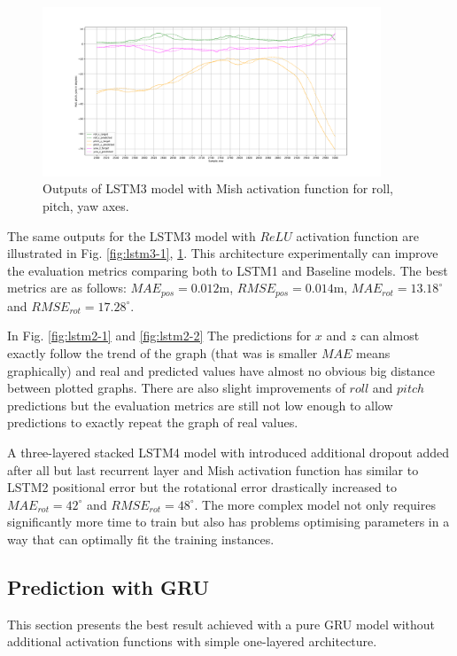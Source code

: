 \begin{figure}[b!]
	\begin{center}
		\includegraphics[width=0.9\textwidth, keepaspectratio]{gfx/lstm3_mish-roll_pitch_yaw.pdf}
		\caption{\label{fig:lstm3-2} Outputs of LSTM3 model with Mish activation function for roll, pitch, yaw axes.}
	\end{center}
\end{figure}

The same outputs for the LSTM3 model with $ReLU$ activation function are illustrated in Fig. \ref{fig:lstm3-1}, \ref{fig:lstm3-2}. This architecture experimentally can improve the evaluation metrics comparing both to LSTM1 and Baseline models. The best metrics are as follows:  $MAE_{pos} = 0.012$m, $RMSE_{pos} = 0.014$m, $MAE_{rot} = 13.18^{\circ}$ and $RMSE_{rot}  =17.28^{\circ}$.

In Fig. \ref{fig:lstm2-1} and \ref{fig:lstm2-2}  The predictions for $x$ and $z$ can almost exactly follow the trend of the graph (that was is smaller $MAE$ means graphically) and real and predicted values have almost no obvious big distance between plotted graphs. There are also slight improvements of $roll$ and $pitch$ predictions but the evaluation metrics are still not low enough to allow predictions to exactly repeat the graph of real values. 

A three-layered stacked LSTM4 model with introduced additional dropout added after all but last recurrent layer and Mish activation function has similar to LSTM2 positional error but the rotational error drastically increased to $MAE_{rot} = 42^{\circ}$ and $RMSE_{rot}  =48^{\circ}$. The more complex model not only requires significantly more time to train but also has problems optimising parameters in a way that can optimally fit the training instances. 

\subsection{Prediction with GRU}
\label{sec:eval:experiments:gru}
This section presents the best result achieved with a pure GRU model without additional activation functions with simple one-layered architecture. 

